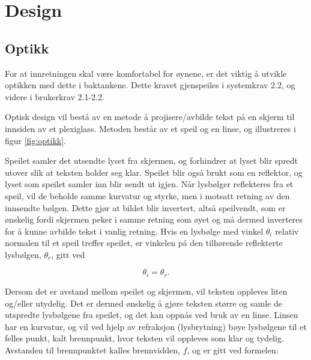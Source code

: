 \section{Design}
\label{sec:design}

\subsection{Optikk}


For at innretningen skal være komfortabel for øynene, er det viktig å utvikle optikken med dette i baktankene. Dette kravet gjenspeiles i systemkrav 2.2, og videre i brukerkrav 2.1-2.2.

Optisk design vil bestå av en metode å projisere/avbilde tekst på en skjerm til innsiden av et plexiglass. Metoden består av et speil og en linse, og illustreres i figur \ref{fig:optikk}. 



Speilet samler det utsendte lyset fra skjermen, og forhindrer at lyset blir spredt utover slik at teksten holder seg klar. Speilet blir også brukt som en reflektor, og lyset som speilet samler inn blir sendt ut igjen. Når lysbølger reflekteres fra et speil, vil de beholde samme kurvatur og styrke, men i motsatt retning av den innsendte bølgen. Dette gjør at bildet blir invertert, altså speilvendt, som er ønskelig fordi skjermen peker i samme retning som øyet og må dermed inverteres for å kunne avbilde tekst i vanlig retning. Hvis en lysbølge med vinkel $\theta_i$ relativ normalen til et speil treffer speilet, er vinkelen på den tilhørende reflekterte lysbølgen, $\theta_r$, gitt ved

\begin{equation}
    \theta_i = \theta_r.
\end{equation}


Dersom det er avstand mellom speilet og skjermen, vil teksten oppleves liten og/eller utydelig. Det er dermed ønskelig å gjøre teksten større og samle de utspredte lysbølgene fra speilet, og det kan oppnås ved bruk av en linse. Linsen har en kurvatur, og vil ved hjelp av refraksjon (lysbrytning) bøye lysbølgene til et felles punkt, kalt brennpunkt, hvor teksten vil oppleves som klar og tydelig. Avstanden til brennpunktet kalles brennvidden, $f$, og er gitt ved formelen:

